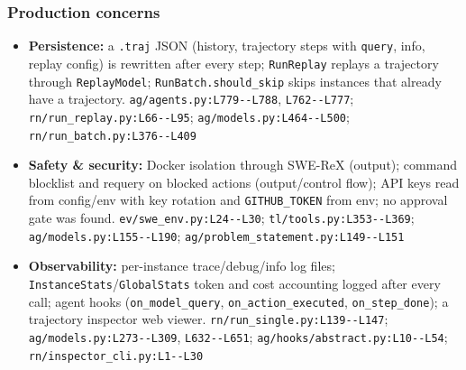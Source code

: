 \subsubsection*{Production concerns}
\begin{itemize}
\item \textbf{Persistence:} a \texttt{.\allowbreak{}traj} JSON (history, trajectory steps with \texttt{query}, info, replay config) is rewritten after every step; \texttt{RunReplay} replays a trajectory through \texttt{ReplayModel}; \texttt{RunBatch.\allowbreak{}should\_\allowbreak{}skip} skips instances that already have a trajectory. \texttt{ag/\allowbreak{}agents.\allowbreak{}py:\allowbreak{}L779-\allowbreak{}-\allowbreak{}L788}, \texttt{L762-\allowbreak{}-\allowbreak{}L777}; \texttt{rn/\allowbreak{}run\_\allowbreak{}replay.\allowbreak{}py:\allowbreak{}L66-\allowbreak{}-\allowbreak{}L95}; \texttt{ag/\allowbreak{}models.\allowbreak{}py:\allowbreak{}L464-\allowbreak{}-\allowbreak{}L500}; \texttt{rn/\allowbreak{}run\_\allowbreak{}batch.\allowbreak{}py:\allowbreak{}L376-\allowbreak{}-\allowbreak{}L409}
\item \textbf{Safety \& security:} Docker isolation through SWE-ReX (output); command blocklist and requery on blocked actions (output/control flow); API keys read from config/env with key rotation and \texttt{GITHUB\_\allowbreak{}TOKEN} from env; no approval gate was found. \texttt{ev/\allowbreak{}swe\_\allowbreak{}env.\allowbreak{}py:\allowbreak{}L24-\allowbreak{}-\allowbreak{}L30}; \texttt{tl/\allowbreak{}tools.\allowbreak{}py:\allowbreak{}L353-\allowbreak{}-\allowbreak{}L369}; \texttt{ag/\allowbreak{}models.\allowbreak{}py:\allowbreak{}L155-\allowbreak{}-\allowbreak{}L190}; \texttt{ag/\allowbreak{}problem\_\allowbreak{}statement.\allowbreak{}py:\allowbreak{}L149-\allowbreak{}-\allowbreak{}L151}
\item \textbf{Observability:} per-instance trace/debug/info log files; \texttt{InstanceStats}/\texttt{GlobalStats} token and cost accounting logged after every call; agent hooks (\texttt{on\_\allowbreak{}model\_\allowbreak{}query}, \texttt{on\_\allowbreak{}action\_\allowbreak{}executed}, \texttt{on\_\allowbreak{}step\_\allowbreak{}done}); a trajectory inspector web viewer. \texttt{rn/\allowbreak{}run\_\allowbreak{}single.\allowbreak{}py:\allowbreak{}L139-\allowbreak{}-\allowbreak{}L147}; \texttt{ag/\allowbreak{}models.\allowbreak{}py:\allowbreak{}L273-\allowbreak{}-\allowbreak{}L309}, \texttt{L632-\allowbreak{}-\allowbreak{}L651}; \texttt{ag/\allowbreak{}hooks/\allowbreak{}abstract.\allowbreak{}py:\allowbreak{}L10-\allowbreak{}-\allowbreak{}L54}; \texttt{rn/\allowbreak{}inspector\_\allowbreak{}cli.\allowbreak{}py:\allowbreak{}L1-\allowbreak{}-\allowbreak{}L30}

\end{itemize}
